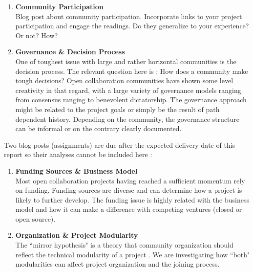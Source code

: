 \begin{enumerate}
  \item {\bf Community Participation} \\
Blog post about community participation. Incorporate links to your project participation and engage the readings. Do they generalize to your experience? Or not? How? \\

  \item {\bf Governance \& Decision Process}\\
  One of toughest issue with large and rather horizontal communities is the decision process. The relevant question here is : How does a community make tough decisions? Open collaboration communities have shown some level creativity in that regard, with a large variety of governance models ranging from consensus ranging to benevolent dictatorship. The governance approach might be related to the project goals or simply be the result of path dependent history. Depending on the community, the governance structure can be informal or on the contrary clearly documented.

\end{enumerate}


\noindent Two blog posts (assignments) are due after the expected delivery date of this report so their analyses cannot be included here :

\begin{enumerate}[resume]
\item {\bf Funding Sources \& Business Model} \\
Most open collaboration projects having reached a sufficient momentum rely on funding. Funding sources are diverse and can determine how a project is likely to further develop. The funding issue is highly related with the business model and how it can make a difference with competing ventures (closed or open source).

\item{\bf Organization \& Project Modularity}\\
The ``mirror hypothesis" is a theory that community organization should reflect the technical modularity of a project \cite{maccormack2012}. We are investigating how ``both" modularities can affect project organization and the joining process.

\end{enumerate}


